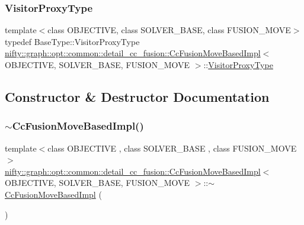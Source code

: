 \subsubsection{\texorpdfstring{Visitor\+Proxy\+Type}{VisitorProxyType}}
{\footnotesize\ttfamily template$<$class O\+B\+J\+E\+C\+T\+I\+VE, class S\+O\+L\+V\+E\+R\+\_\+\+B\+A\+SE, class F\+U\+S\+I\+O\+N\+\_\+\+M\+O\+VE$>$ \\
typedef Base\+Type\+::\+Visitor\+Proxy\+Type \hyperlink{classnifty_1_1graph_1_1opt_1_1common_1_1detail__cc__fusion_1_1CcFusionMoveBasedImpl}{nifty\+::graph\+::opt\+::common\+::detail\+\_\+cc\+\_\+fusion\+::\+Cc\+Fusion\+Move\+Based\+Impl}$<$ O\+B\+J\+E\+C\+T\+I\+VE, S\+O\+L\+V\+E\+R\+\_\+\+B\+A\+SE, F\+U\+S\+I\+O\+N\+\_\+\+M\+O\+VE $>$\+::\hyperlink{classnifty_1_1graph_1_1opt_1_1common_1_1detail__cc__fusion_1_1CcFusionMoveBasedImpl_ad095e84770fba24fc09427dc862b4fe7}{Visitor\+Proxy\+Type}}



\subsection{Constructor \& Destructor Documentation}
\mbox{\label{classnifty_1_1graph_1_1opt_1_1common_1_1detail__cc__fusion_1_1CcFusionMoveBasedImpl_a017995a1591959b12b4bb4a8cbf57557}} 
\subsubsection{\texorpdfstring{$\sim$\+Cc\+Fusion\+Move\+Based\+Impl()}{~CcFusionMoveBasedImpl()}}
{\footnotesize\ttfamily template$<$class O\+B\+J\+E\+C\+T\+I\+VE , class S\+O\+L\+V\+E\+R\+\_\+\+B\+A\+SE , class F\+U\+S\+I\+O\+N\+\_\+\+M\+O\+VE $>$ \\
\hyperlink{classnifty_1_1graph_1_1opt_1_1common_1_1detail__cc__fusion_1_1CcFusionMoveBasedImpl}{nifty\+::graph\+::opt\+::common\+::detail\+\_\+cc\+\_\+fusion\+::\+Cc\+Fusion\+Move\+Based\+Impl}$<$ O\+B\+J\+E\+C\+T\+I\+VE, S\+O\+L\+V\+E\+R\+\_\+\+B\+A\+SE, F\+U\+S\+I\+O\+N\+\_\+\+M\+O\+VE $>$\+::$\sim$\hyperlink{classnifty_1_1graph_1_1opt_1_1common_1_1detail__cc__fusion_1_1CcFusionMoveBasedImpl}{Cc\+Fusion\+Move\+Based\+Impl} (\begin{DoxyParamCaption}{ }\end{DoxyParamCaption})\hspace{0.3cm}{\ttfamily [virtual]}}

